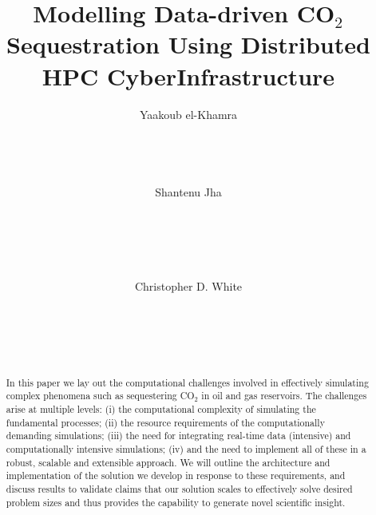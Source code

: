 \documentclass{acm_proc_article-sp}
\begin{document}
\title{Modelling Data-driven CO$_{2}$ Sequestration Using Distributed HPC CyberInfrastructure}



\author{
\alignauthor
Yaakoub el-Khamra\\
       \\
       \\
       \\
       \\
\alignauthor
Shantenu Jha\\
       \\
       \\
       \\
       \\
       \\
\alignauthor
Christopher D. White\\
       \\
       \\
       \\
       \\
}

\maketitle

\begin{abstract} In this paper we lay out the
  computational challenges involved in effectively simulating complex
  phenomena such as sequestering CO$_2$ in  oil and gas
  reservoirs. The challenges arise at multiple levels: (i) the
  computational complexity of simulating the fundamental processes;
  (ii) the resource requirements of the computationally demanding
  simulations; (iii) the need for integrating real-time data
  (intensive) and computationally intensive simulations; (iv) and the
  need to implement all of these in a robust, scalable and extensible
  approach. We will outline the architecture and implementation of the
  solution we develop in response to these requirements, and discuss
  results to validate claims that our solution scales to effectively
  solve desired problem sizes and thus provides the capability to
  generate novel scientific insight.\end{abstract}
\end{document}
